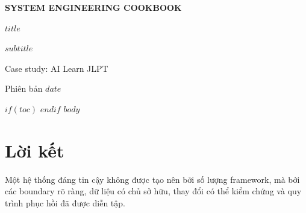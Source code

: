 \documentclass[10pt,b5paper,open=any]{scrbook}
\begin{document}
\frontmatter
\begin{titlepage}
  \pagecolor{BookNavy}\color{white}
  \vspace*{18mm}
  {\sffamily\bfseries\fontsize{11}{13}\selectfont\color{cyan!45} SYSTEM ENGINEERING COOKBOOK\par}
  \vspace{14mm}
  {\sffamily\bfseries\fontsize{30}{35}\selectfont $title$\par}
  \vspace{9mm}
  {\sffamily\fontsize{15}{20}\selectfont\color{white!82} $subtitle$\par}
  \vfill
  {\sffamily\color{white!75} Case study: AI Learn JLPT\par}
  {\sffamily\color{white!75} Phiên bản $date$\par}
\end{titlepage}
\nopagecolor\color{black}
$if(toc)$
\tableofcontents
\clearpage
$endif$
\let\cleardoublepage\clearpage
\mainmatter
$body$
\backmatter
\chapter*{Lời kết}
Một hệ thống đáng tin cậy không được tạo nên bởi số lượng framework, mà bởi các
boundary rõ ràng, dữ liệu có chủ sở hữu, thay đổi có thể kiểm chứng và quy trình
phục hồi đã được diễn tập.
\end{document}
